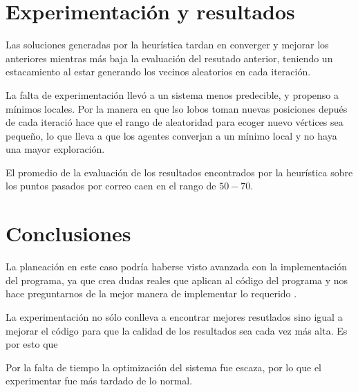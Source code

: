 \documentclass[a4paper]{article}
\begin{document}
\section*{Experimentaci\'on y resultados}

Las soluciones generadas por la heur\'istica tardan en converger y mejorar los anteriores mientras
m\'as baja la evaluaci\'on del resutado anterior, teniendo un estacamiento al estar generando los
vecinos aleatorios en cada iteraci\'on.



La falta de experimentaci\'on llev\'o a un sistema menos predecible, y propenso a m\'inimos locales.
Por la manera en que lso lobos toman nuevas posiciones depu\'es de cada iteraci\'o hace que el rango de aleatoridad para ecoger nuevo v\'ertices sea pequeño, lo que lleva a que los agentes converjan a
un m\'inimo local y no haya una mayor exploraci\'on.

El promedio de la evaluaci\'on de los resultados encontrados por la heur\'istica sobre los puntos pasados por correo caen en el rango de $50 - 70$. 



\section*{Conclusiones}
La planeaci\'on en este caso podr\'ia haberse visto avanzada con la implementaci\'on del programa,
ya que crea dudas reales que aplican al c\'odigo del programa y nos hace preguntarnos de la mejor
manera de implementar lo requerido .

La experimentaci\'on no s\'olo conlleva a encontrar mejores resutlados sino igual a mejorar el
c\'odigo para que la calidad de los resultados sea cada vez m\'as alta. Es por esto que

Por la falta de tiempo la optimización del sistema fue escaza, por lo que el experimentar fue m\'as
tardado de lo normal.


{}

\end{document}
